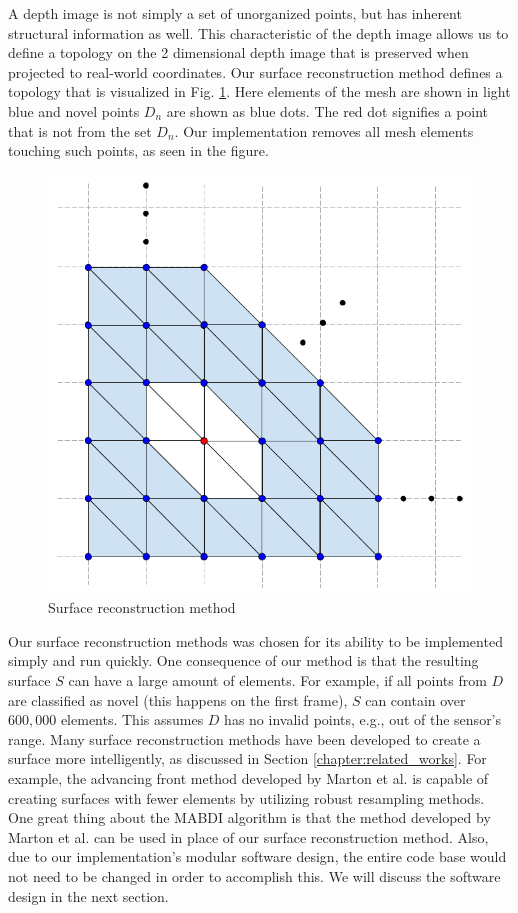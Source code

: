 A depth image is not simply a set of unorganized points, but has inherent
structural information as well. This characteristic of the depth image allows us
to define a topology on the 2 dimensional depth image that is preserved when
projected to real-world coordinates. Our surface reconstruction method defines a
topology that is visualized in Fig. \ref{fig:srm}. Here elements of the mesh
are shown in light blue and novel points $D_n$ are shown as blue dots. The red
dot signifies a point that is not from the set $D_n$. Our implementation removes
all mesh elements touching such points, as seen in the figure.

\begin{figure}[h]%
\centering
  \includegraphics[width=.6\textwidth]
    {figures/diagram_surface_reconstruction.png}
  \caption{Surface reconstruction method}
  \label{fig:srm}
\end{figure}

Our surface reconstruction methods was chosen for its ability to be implemented
simply and run quickly. One consequence of our method is that the resulting
surface $S$ can have a large amount of elements. For example, if all points from
$D$ are classified as novel (this happens on the first frame), $S$ can contain
over $600,000$ elements. This assumes $D$ has no invalid points, e.g., out of
the sensor's range. Many surface reconstruction methods have been developed to
create a surface more intelligently, as discussed in Section
\ref{chapter:related_works}. For example, the advancing front method developed
by Marton et al. \cite{Marton2009} is capable of creating surfaces with fewer
elements by utilizing robust resampling methods. One great thing about the MABDI
algorithm is that the method developed by Marton et al. can be used in place of
our surface reconstruction method. Also, due to our implementation's modular
software design, the entire code base would not need to be changed in order to
accomplish this. We will discuss the software design in the next section.

